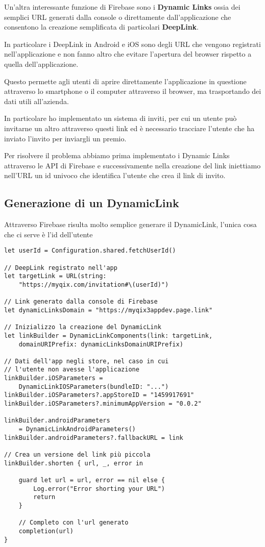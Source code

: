 
Un'altra interessante funzione di Firebase sono i \textbf{Dynamic Links}
ossia dei semplici URL generati dalla console o direttamente dall'applicazione
che consentono la creazione semplificata di particolari \textbf{DeepLink}.

In particolare i DeepLink in Android e iOS sono degli URL che vengono registrati nell'applicazione
e non fanno altro che evitare l'apertura del browser rispetto a quella dell'applicazione.

Questo permette agli utenti di aprire direttamente l'applicazione in questione
attraverso lo smartphone o il computer attraverso il browser, ma trasportando dei dati utili all'azienda.



In particolare ho implementato un sistema di inviti, per cui 
un utente può invitarne un altro attraverso questi link ed è necessario tracciare
l'utente che ha inviato l'invito per inviargli un premio.

Per risolvere il problema abbiamo prima implementato i Dynamic Links attraverso le API
di Firebase e successivamente nella creazione del link iniettiamo nell'URL un id univoco che identifica l'utente
che crea il link di invito.

\subsection*{Generazione di un DynamicLink}

Attraverso Firebase risulta molto semplice generare il DynamicLink,
l'unica cosa che ci serve è l'id dell'utente

\begin{verbatim}
let userId = Configuration.shared.fetchUserId() 

// DeepLink registrato nell'app
let targetLink = URL(string:
    "https://myqix.com/invitation#\(userId)")

// Link generato dalla console di Firebase
let dynamicLinksDomain = "https://myqix3appdev.page.link"

// Inizializzo la creazione del DynamicLink
let linkBuilder = DynamicLinkComponents(link: targetLink,
    domainURIPrefix: dynamicLinksDomainURIPrefix)

// Dati dell'app negli store, nel caso in cui
// l'utente non avesse l'applicazione
linkBuilder.iOSParameters = 
    DynamicLinkIOSParameters(bundleID: "...")
linkBuilder.iOSParameters?.appStoreID = "1459917691"
linkBuilder.iOSParameters?.minimumAppVersion = "0.0.2"

linkBuilder.androidParameters
    = DynamicLinkAndroidParameters()
linkBuilder.androidParameters?.fallbackURL = link

// Crea un versione del link più piccola
linkBuilder.shorten { url, _, error in
    
    guard let url = url, error == nil else {
        Log.error("Error shorting your URL")
        return
    }
    
    // Completo con l'url generato
    completion(url)
}

\end{verbatim}

